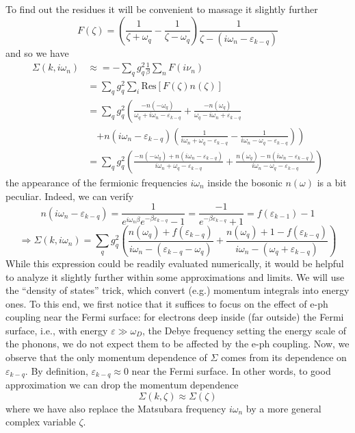 To find out the residues it will be convenient to massage it slightly further
\[ F\left( \zeta \right) =\left( \frac{1}{\zeta +\omega _q}-\frac{1}{\zeta -\omega _q} \right) \frac{1}{\zeta -\left( i\omega _n-\varepsilon _{k-q} \right)}\]
and so we have
\begin{align*}
    \Sigma \left( k,i\omega _n \right) &\approx =-\sum_q{g_{q}^{2}\frac{1}{\beta}\sum_n{F\left( i\nu _n \right)}}\\
    &=\sum_q{g_{q}^{2}\sum_i{\mathrm{Res}\left[ F\left( \zeta \right) n\left( \zeta \right) \right]}}\\
    &=\sum_q{g_{q}^{2}\left( \frac{-n\left( -\omega _q \right)}{\omega _q+i\omega _n-\varepsilon _{k-q}}+\frac{-n\left( \omega _q \right)}{\omega _q-i\omega _n+\varepsilon _{k-q}} \right.}\\
    &\quad \left. +n\left( i\omega _n-\varepsilon _{k-q} \right) \left( \frac{1}{i\omega _n+\omega _q-\varepsilon _{k-q}}-\frac{1}{i\omega _n-\omega _q-\varepsilon _{k-q}} \right) \right) \\
    &=\sum_q{g_{q}^{2}\left( \frac{-n\left( -\omega _q \right) +n\left( i\omega _n-\varepsilon _{k-q} \right)}{i\omega _n+\omega _q-\varepsilon _{k-q}}+\frac{n\left( \omega _q \right) -n\left( i\omega _n-\varepsilon _{k-q} \right)}{i\omega _n-\omega _q-\varepsilon _{k-q}} \right)}
\end{align*}
the appearance of the fermionic frequencies $i\omega_n$ inside the bosonic $n(\omega)$ is a bit peculiar. Indeed, we can verify
\[ n\left( i\omega _n-\varepsilon _{k-q} \right) =\frac{1}{e^{i\omega _n\beta}e^{-\beta \varepsilon _{k-q}}-1}=\frac{-1}{e^{-\beta \varepsilon _{k-q}}+1}=f\left( \varepsilon _{k-1} \right) -1\]
\[ \Rightarrow \Sigma \left( k,i\omega _n \right) =\sum_q{g_{q}^{2}\left( \frac{n\left( \omega _q \right) +f\left( \varepsilon _{k-q} \right)}{i\omega _n-\left( \varepsilon _{k-q}-\omega _q \right)}+\frac{n\left( \omega _q \right) +1-f\left( \varepsilon _{k-q} \right)}{i\omega _n-\left( \omega _q+\varepsilon _{k-q} \right)} \right)}\]
While this expression could be readily evaluated numerically, it would be helpful to analyze it slightly further within some approximations and limits. We will use the ``density of states'' trick, which convert (e.g.) momentum integrals into energy ones. To this end, we first notice that it suffices to focus on the effect of e-ph coupling near the Fermi surface: for electrons deep inside (far outside) the Fermi surface, i.e., with energy $\varepsilon\gg \omega_D$, the Debye frequency setting the energy scale of the phonons, we do not expect them to be affected by the e-ph coupling. Now, we observe that the only momentum dependence of $\Sigma$ comes from its dependence on $\varepsilon_{k-q}$. By definition, $\varepsilon_{k-q}\approx 0$ near the Fermi surface. In other words, to good approximation we can drop the momentum dependence
\[\Sigma \left( k,\zeta \right) \approx \Sigma \left( \zeta \right) \]
where we have also replace the Matsubara frequency $i\omega_n$ by a more general complex variable $\zeta$.


